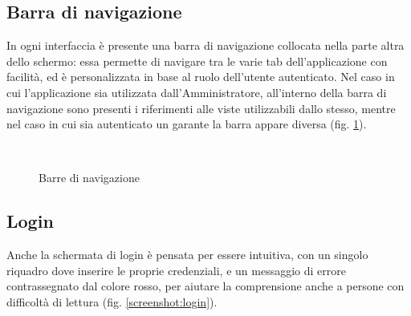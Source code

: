 \subsection{Barra di navigazione}
In ogni interfaccia è presente una barra di navigazione collocata nella parte altra dello schermo: essa permette di navigare tra le varie tab dell'applicazione con facilità, ed è personalizzata in base al ruolo dell'utente autenticato. 
Nel caso in cui l'applicazione sia utilizzata dall'Amministratore, all'interno della barra di navigazione sono presenti i riferimenti alle viste utilizzabili dallo stesso, mentre nel caso in cui sia autenticato un garante la barra appare diversa (fig. \ref{screenshot:mainview}).
\begin{figure}
	\centering
	\\
	\caption{Barre di navigazione}
	\label{screenshot:mainview}
\end{figure}

\subsection{Login}
Anche la schermata di login è pensata per essere intuitiva, con un singolo riquadro dove inserire le proprie credenziali, e un messaggio di errore contrassegnato dal colore rosso, per aiutare la comprensione anche a persone con difficoltà di lettura (fig. \ref{screenshot:login}).

